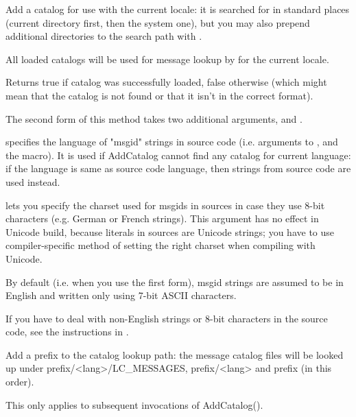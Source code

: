 Add a catalog for use with the current locale: it is searched for in standard
places (current directory first, then the system one), but you may also prepend
additional directories to the search path with 
.

All loaded catalogs will be used for message lookup by
 for the current locale.

Returns true if catalog was successfully loaded, false otherwise (which might
mean that the catalog is not found or that it isn't in the correct format).

The second form of this method takes two additional arguments,
 and .

 specifies the language of "msgid" strings in source code
(i.e. arguments to ,
 and the 
 macro). It is used if AddCatalog cannot find any
catalog for current language: if the language is same as source code language,
then strings from source code are used instead. 

 lets you specify the charset used for msgids in sources
in case they use 8-bit characters (e.g. German or French strings).  This
argument has no effect in Unicode build, because literals in sources are
Unicode strings; you have to use compiler-specific method of setting the right
charset when compiling with Unicode.

By default (i.e. when you use the first form), msgid strings are assumed
to be in English and written only using 7-bit ASCII characters.

If you have to deal with non-English strings or 8-bit characters in the source
code, see the instructions in 
.


\label{wxlocaleaddcataloglookuppathprefix}


Add a prefix to the catalog lookup path: the message catalog files will be
looked up under prefix/<lang>/LC\_MESSAGES, prefix/<lang> and prefix
(in this order).

This only applies to subsequent invocations of AddCatalog().

\label{wxlocaleaddlanguage}

